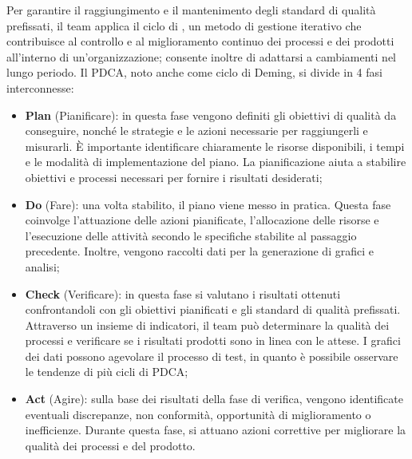 \par Per garantire il raggiungimento e il mantenimento degli standard di qualità prefissati, il team applica il ciclo di , un metodo di gestione iterativo che contribuisce al controllo e al miglioramento continuo dei processi e dei prodotti all'interno di un'organizzazione; consente inoltre di adattarsi a cambiamenti nel lungo periodo. Il PDCA, noto anche come ciclo di Deming, si divide in 4 fasi interconnesse:
\begin{itemize}
    \item \textbf{Plan} (Pianificare): in questa fase vengono definiti gli obiettivi di qualità da conseguire, nonché le strategie e le azioni necessarie per raggiungerli e misurarli. È importante identificare chiaramente le risorse disponibili, i tempi e le modalità di implementazione del piano. La pianificazione aiuta a stabilire obiettivi e processi necessari per fornire i risultati desiderati;
    \item \textbf{Do} (Fare): una volta stabilito, il piano viene messo in pratica. Questa fase coinvolge l'attuazione delle azioni pianificate, l'allocazione delle risorse e l'esecuzione delle attività secondo le specifiche stabilite al passaggio precedente. Inoltre, vengono raccolti dati per la generazione di grafici e analisi;
    \item \textbf{Check} (Verificare): in questa fase si valutano i risultati ottenuti confrontandoli con gli obiettivi pianificati e gli standard di qualità prefissati. Attraverso un insieme di indicatori, il team può determinare la qualità dei processi e verificare se i risultati prodotti sono in linea con le attese. I grafici dei dati possono agevolare il processo di test, in quanto è possibile osservare le tendenze di più cicli di PDCA;
    \item \textbf{Act} (Agire): sulla base dei risultati della fase di verifica, vengono identificate eventuali discrepanze, non conformità, opportunità di miglioramento o inefficienze. Durante questa fase, si attuano azioni correttive per migliorare la qualità dei processi e del prodotto.
\end{itemize}

